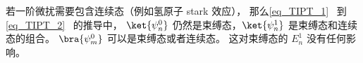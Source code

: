 
若一阶微扰需要包含连续态（例如氢原子 stark 效应）， 那么\autoref{eq_TIPT_1}~ 到\autoref{eq_TIPT_2}~ 的推导中， $\ket{\psi_n^0}$ 仍然是束缚态，$\ket{\psi_n^1}$ 是束缚态和连续态的组合。 $\bra{\psi_m^0}$ 可以是束缚态或者连续态。 这对束缚态的 $E_n^1$ 没有任何影响。
